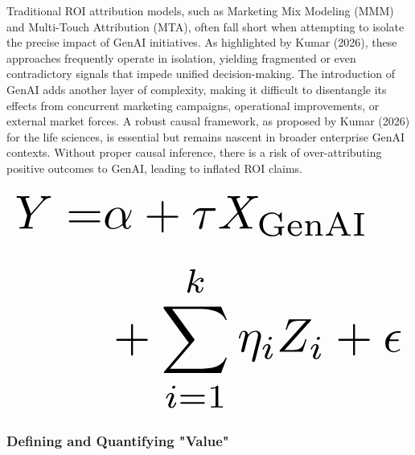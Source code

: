 \documentclass[10pt,twocolumn,letterpaper]{article}
\begin{document}
Traditional ROI attribution models, such as Marketing Mix Modeling (MMM) and Multi-Touch Attribution (MTA), often fall short when attempting to isolate the precise impact of GenAI initiatives. As highlighted by Kumar (2026), these approaches frequently operate in isolation, yielding fragmented or even contradictory signals that impede unified decision-making. The introduction of GenAI adds another layer of complexity, making it difficult to disentangle its effects from concurrent marketing campaigns, operational improvements, or external market forces. A robust causal framework, as proposed by Kumar (2026) for the life sciences, is essential but remains nascent in broader enterprise GenAI contexts. Without proper causal inference, there is a risk of over-attributing positive outcomes to GenAI, leading to inflated ROI claims.


























\begin{equation}
\resizebox{\columnwidth}{!}{$\displaystyle
\begin{aligned}
Y = & \alpha + \tau X_{\text{GenAI}} \\
& + \sum_{i=1}^k \eta_i Z_i + \epsilon
\end{aligned}
$}
\end{equation}



























\subsubsection{Defining and Quantifying "Value"}
\end{document}
